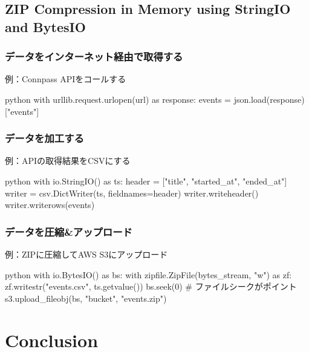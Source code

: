 \documentclass[aspectratio=169,dvipdfmx,14pt,notheorems]{beamer}
\theoremstyle{definition}
\begin{document}
\subsection{ZIP Compression in Memory using StringIO and BytesIO}

\begin{frame}[fragile]\frametitle{データをインターネット経由で取得する}

\begin{exampleblock}{例：Connpass APIをコールする}
\begin{pygments}{python}
with urllib.request.urlopen(url) as response:
    events = json.load(response)["events"]
\end{pygments}
\end{exampleblock}

\end{frame}

\begin{frame}[fragile]\frametitle{データを加工する}

\begin{exampleblock}{例：APIの取得結果をCSVにする}
\begin{pygments}{python}
with io.StringIO() as ts:
    header = ["title", "started_at", "ended_at"]
    writer = csv.DictWriter(ts, fieldnames=header)
    writer.writeheader()
    writer.writerows(events)
\end{pygments}
\end{exampleblock}

\end{frame}

\begin{frame}[fragile]\frametitle{データを圧縮\&アップロード}

\begin{exampleblock}{例：ZIPに圧縮してAWS S3にアップロード}
\begin{pygments}{python}
with io.BytesIO() as bs:
    with zipfile.ZipFile(bytes_stream, "w") as zf:
        zf.writestr("events.csv", ts.getvalue())
    bs.seek(0)  # ファイルシークがポイント
    s3.upload_fileobj(bs, "bucket", "events.zip")
\end{pygments}
\end{exampleblock}

\end{frame}

\section{Conclusion}
\end{document}
